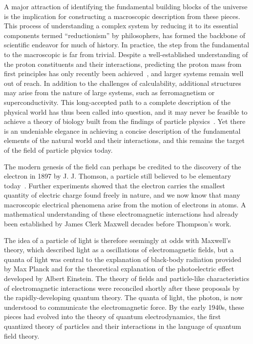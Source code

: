 A major attraction of identifying the fundamental building blocks of the universe
is the implication for constructing a macroscopic description from these
pieces. This process of understanding a complex system 
by reducing it to its essential components
termed ``reductionism'' by philosophers, 
has formed the backbone of scientific endeavor for much of history.
In practice, the step from the fundamental to the macroscopic 
is far from trivial. Despite a well-established
understanding of the proton constituents and their interactions,
predicting the proton mass from first principles has only recently 
been achieved~\cite{Durr:2008zz}, and larger systems remain well
out of reach.
In addition to the challenges of calculability, additional structures
may arise from the nature of large systems, such as ferromagnetism or 
superconductivity.
This long-accepted path to a complete description of the physical world
has thus been called into question, and it may never be feasible
to achieve a theory of biology built from the findings of particle 
physics~\cite{Anderson393}.
Yet there is an undeniable elegance in achieving a concise description
of the fundamental elements of the natural world and their interactions,
and this remains the target of the field of particle physics today. 

The modern genesis of the field can perhaps be credited to 
the discovery of the electron in 1897 by J. J. Thomson, a particle still
believed to be elementary today~\cite{}.
Further experiments showed that the electron carries the smallest quantity of electric charge found
freely in nature, and we now know that many macroscopic electrical phenomena
arise from the motion of electrons in atoms.
A mathematical understanding of these electromagnetic interactions had 
already been established by James Clerk Maxwell decades before Thompson's work.


The idea of a particle of light is therefore seemingly at odds with Maxwell's theory,
which described light as a oscillations of electromagnetic fields,
but a quanta of light was central to the explanation of black-body radiation provided by Max Planck 
and for the theoretical explanation of the photoelectric effect developed by Albert Einstein.
The theory of fields and particle-like characteristics of electromagnetic
interactions were reconciled shortly after these proposals by the 
rapidly-developing quantum theory.
The quanta of light, the photon, is now understood to communicate the electromagnetic force.
By the early 1940s, these pieces had evolved into the theory of quantum 
electrodynamics, the first
quantized theory of particles and their interactions in the language 
of quantum field theory. 

